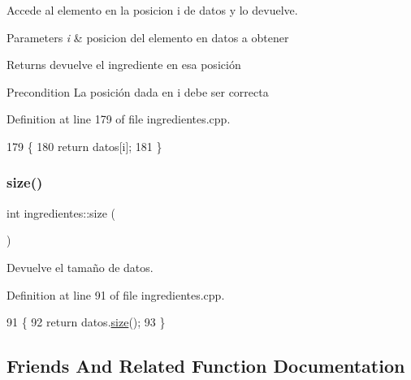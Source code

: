 Accede al elemento en la posicion i de datos y lo devuelve. 


\begin{DoxyParams}{Parameters}
{\em i} & posicion del elemento en datos a obtener \\
\hline
\end{DoxyParams}
\begin{DoxyReturn}{Returns}
devuelve el ingrediente en esa posición 
\end{DoxyReturn}
\begin{DoxyPrecond}{Precondition}
La posición dada en i debe ser correcta 
\end{DoxyPrecond}


Definition at line 179 of file ingredientes.\+cpp.


\begin{DoxyCode}
179                                             \{
180     \textcolor{keywordflow}{return} datos[i];
181 \}
\end{DoxyCode}
\mbox{\label{classingredientes_a642511344976e22479ae78e4ee2917f9}} 
\subsubsection{\texorpdfstring{size()}{size()}}
{\footnotesize\ttfamily int ingredientes\+::size (\begin{DoxyParamCaption}{ }\end{DoxyParamCaption})}



Devuelve el tamaño de datos. 



Definition at line 91 of file ingredientes.\+cpp.


\begin{DoxyCode}
91                       \{
92     \textcolor{keywordflow}{return} datos.\hyperlink{classVD_a411ad026db1c8e0617d9031f1f1017a5}{size}();
93 \}
\end{DoxyCode}


\subsection{Friends And Related Function Documentation}
\mbox{\label{classingredientes_a9516ae2a429fa3af5b8d59b98a285c86}} 
